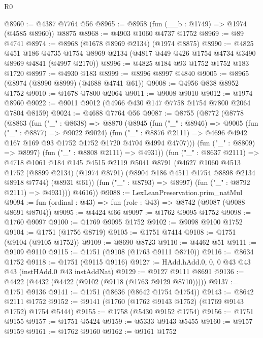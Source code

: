 \begin{lexlean}{R0}
\begin{coremodule}
@8960 := @4387 @7764 @56
@8965 := @8958 (fun (__b : @1749) => @1974 (@4585 @8960)) @8875
@8968 := @4903 @1060 @4737 @1752
@8969 := @89 @4741
@8974 := @8968 (@1678 @8969 @2134) (@1974 @8875)
@8990 := @4825
    @451
    @186
    @4735
    @1754
    @8969
    @2134
    (@4817 @449 @426 @1754 @4734 @3490 @8969 @4841 (@4997 @2170))
@8996 := @4825 @184 @93 @1752 @1752 @183 @1720
@8997 := @4930 @183
@8999 := @8996 @8997 @4840
@9005 := @8965 (@8974 (@8990 @8999) (@4688 @4741 @61))
@9008 := @4956 @838 @8952 @1752
@9010 := @1678 @7800 @2064
@9011 := @9008 @9010
@9012 := @1974 @8960
@9022 := @9011 @9012 (@4966 @430 @147 @7758 @1754 @7800 @2064 @7804 @8159)
@9024 := @4688 @7764 @56
@9087 := @8755
    (@8772
      (@8778
        (@8863
          (fun ("_" : @8638) =>
          @8870
            (@8945
              (fun ("_" : @8946) =>
              @9005
                (fun ("_" : @8877) => @9022 @9024)
                (fun ("_" : @8876 @2111) =>
                @4696 @4942 @167 @169 @93 @1752 @1752 @1720 @4704 @4994 @4707)))
            (fun ("_" : @8809) => @8997)
            (fun ("_" : @8808 @2111) => @4931))
          (fun ("_" : @8637 @2111) =>
          @4718
            @1061
            @184
            @145
            @4515
            @2119
            @5041
            @8791
            (@4627
              @1060
              @4513
              @1752
              (@8899 @2134)
              (@1974 @8791)
              (@8904 @186 @4511 @1754 @8898 @2134 @8918 @7744)
              (@8931 @61))
            (fun ("_" : @8793) => @8997)
            (fun ("_" : @8792 @2111) => @4931)))
        @4616))
@9088 := LexLeanPreservation.prim_natMul
@9094 := fun (ordinal : @43) => fun (role : @43) => @8742 (@9087 (@9088 @8691 @8704))
@9095 := @4424 @66
@9097 := @1762 @9095 @1752
@9098 := @1760 @9097
@9100 := @1769 @9095 @1752
@9102 := @9098 @9100 @1752
@9104 := @1751 (@1756 @8719)
@9105 := @1751 @7414
@9108 := @1751 (@9104 (@9105 @1752))
@9109 := @8690 @8723
@9110 := @4462 @51
@9111 := @9109 @9110
@9115 := @1751 (@9108 (@1763 @9111 @8710))
@9116 := @8634 @1752
@9118 := @1751 (@9115 @9116)
@9127 := HAdd.hAdd.{0, 0, 0} @43 @43 @43 (instHAdd.{0} @43 instAddNat)
@9129 := @9127 @9111 @8691
@9136 := @4422 (@4432 (@4422 (@9102 (@9118 (@1763 @9129 @8710)))))
@9137 := @1751 @9136
@9141 := @1751 (@8636 (@8642 @1754 @1754))
@9143 := @8642 @2111 @1752
@9152 := @9141 (@1760 (@1762 @9143 @1752) (@1769 @9143 @1752) @1754 @5444)
@9155 := @1758 (@5430 @9152 @1754)
@9156 := @1751 @9155
@9157 := @1751 @5424
@9159 := @5333 @9143 @5455
@9160 := @9157 @9159
@9161 := @1762 @9160
@9162 := @9161 @1752

\end{coremodule}
\end{lexlean}
